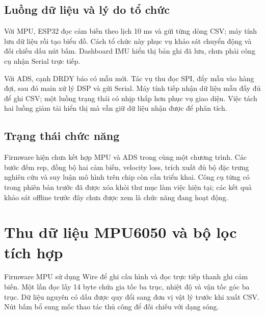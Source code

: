 \documentclass[12pt,letterpaper]{article}
\begin{document}
\subsection*{Luồng dữ liệu và lý do tổ chức}

Với MPU, ESP32 đọc cảm biến theo lịch 10 ms và gửi từng dòng CSV; máy tính lưu dữ liệu rồi tạo biểu đồ. Cách tổ chức này phục vụ khảo sát chuyển động và đối chiếu dấu nút bấm. Dashboard IMU hiển thị bản ghi đã lưu, chưa phải công cụ nhận Serial trực tiếp.


Với ADS, cạnh DRDY báo có mẫu mới. Tác vụ thu đọc SPI, đẩy mẫu vào hàng đợi, sau đó main xử lý DSP và gửi Serial. Máy tính tiếp nhận dữ liệu mẫu đầy đủ để ghi CSV; một luồng trạng thái có nhịp thấp hơn phục vụ giao diện. Việc tách hai luồng giảm tải hiển thị mà vẫn giữ dữ liệu nhận được để phân tích.


\subsection*{Trạng thái chức năng}

Firmware hiện chưa kết hợp MPU và ADS trong cùng một chương trình. Các bước đếm rep, đồng bộ hai cảm biến, velocity loss, trích xuất đủ bộ đặc trưng nghiên cứu và suy luận mô hình trên chip còn cần triển khai. Công cụ  từng có trong phiên bản trước đã được xóa khỏi thư mục làm việc hiện tại; các kết quả khảo sát offline trước đây chưa được xem là chức năng đang hoạt động.





\clearpage

\section{Thu dữ liệu MPU6050 và bộ lọc tích hợp}

Firmware MPU sử dụng Wire để ghi cấu hình và đọc trực tiếp thanh ghi cảm biến. Một lần đọc lấy 14 byte chứa gia tốc ba trục, nhiệt độ và vận tốc góc ba trục. Dữ liệu nguyên có dấu được quy đổi sang đơn vị vật lý trước khi xuất CSV. Nút bấm bổ sung mốc thao tác thủ công để đối chiếu với dạng sóng.
\end{document}
